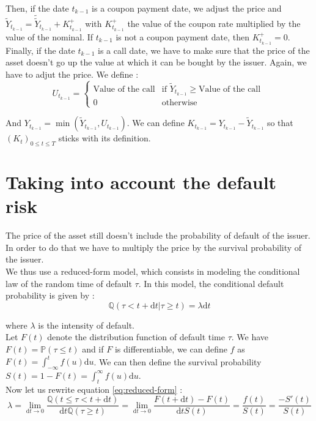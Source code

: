 \documentclass[a4paper,11pt,english]{book}
\begin{document}
Then, if the date $t_{k-1}$ is a coupon payment date, we adjust the price and $\widetilde{Y}_{t_{k-1}}= \widetilde{\widetilde{Y}}_{t_{k-1}} + K_{t_{k-1}}^{+}$ with $K_{t_{k-1}}^{+}$ the value of the coupon rate multiplied by the value of the nominal. If $t_{k-1}$ is not a coupon payment date, then $K_{t_{k-1}}^{+}=0$. \\
Finally, if the date $t_{k-1}$ is a call date, we have to make sure that the price of the asset doesn't go up the value at which it can be bought by the issuer. Again, we have to adjut the price. We define :
$$U_{t_{k-1}}=
\begin{cases}
\text{Value of the call} & \text{if } \widetilde{Y}_{t_{k-1}}\geq \text{Value of the call }\\
0& \text{otherwise }
\end{cases}$$

And $Y_{t_{k-1}}=\min(\widetilde{Y}_{t_{k-1}},U_{t_{k-1}})$. We can define $K_{t_{k-1}}=Y_{t_{k-1}}-\widetilde{Y}_{t_{k-1}}$ so that $(K_{t})_{0\leq t\leq T}$ sticks with its definition.

\newpage
\section{Taking into account the default risk}
The price of the asset still doesn't include the probability of default of the issuer. In order to do that we have to multiply the price by the survival probability of the issuer.\\

We thus use a reduced-form model, which consists in modeling the conditional law of the random time of default $\tau$. In this model, the conditional default probability is given by :
\begin{equation}
    \mathbb{Q}(\tau<t+\text{d}t|\tau\geq t)=\lambda \text{d}t
    \label{eq:reduced-form}
\end{equation}


where $\lambda$ is the intensity of default.\\

Let $F(t)$ denote the distribution function of default time $\tau$. We have $F(t)=\mathbb{P}(\tau\leq t)$ and if $F$ is differentiable, we can define $f$ as $F(t)=\int_{-\infty}^{t}f(u)\text{d}u$.
We can then define the survival probability $S(t) = 1-F(t) = \int_{t}^{\infty}f(u)\text{d}u$.\\

Now let us rewrite equation \ref{eq:reduced-form} :
$$\lambda = \underset{\text{d}t\to 0}{\lim} \frac{\mathbb{Q}(t\leq \tau<t+\text{d}t)}{\text{d}t\mathbb{Q}(\tau\geq t)} = \underset{\text{d}t\to 0}{\lim} \frac{F(t+\text{d}t)-F(t)}{\text{d}t S(t)}=\frac{f(t)}{S(t)}=\frac{-S'(t)}{S(t)}$$
\end{document}
